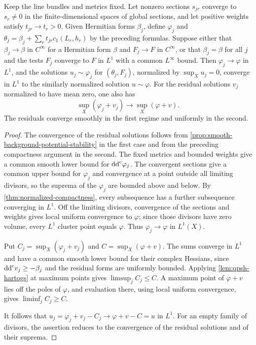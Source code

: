 \begin{theorem}\label{thm:moving-divisorial-potential-stability}
Keep the line bundles and metrics fixed. Let nonzero sections $s_{jr}$ converge to $s_r\ne0$ in the finite-dimensional spaces of global sections, and let positive weights satisfy $t_{jr}\to t_r>0$. Given Hermitian forms $\beta_j$, define $\varphi_j$ and $\theta_j=\beta_j+\sum_rt_{jr}c_1(L_r,h_r)$ by the preceding formulas. Suppose either that $\beta_j\to\beta$ in $C^\infty$ for a Hermitian form $\beta$ and $F_j\to F$ in $C^\infty$, or that $\beta_j=\beta$ for all $j$ and the tests $F_j$ converge to $F$ in $L^1$ with a common $L^\infty$ bound. Then $\varphi_j\to\varphi$ in $L^1$, and the solutions $u_j\sim\varphi_j$ for $(\theta_j,F_j)$, normalized by $\sup_Xu_j=0$, converge in $L^1$ to the similarly normalized solution $u\sim\varphi$. For the residual solutions $v_j$ normalized to have mean zero, one also has
\[
 \sup_X(\varphi_j+v_j)\longrightarrow\sup_X(\varphi+v).
\]
The residuals converge smoothly in the first regime and uniformly in the second.
\end{theorem}
\begin{proof}
The convergence of the residual solutions follows from \cref{prop:smooth-background-potential-stability} in the first case and from the preceding compactness argument in the second. The fixed metrics and bounded weights give a common smooth lower bound for $\mathrm{dd}^{\mathrm{c}}\varphi_j$. The convergent sections give a common upper bound for $\varphi_j$ and convergence at a point outside all limiting divisors, so the suprema of the $\varphi_j$ are bounded above and below. By \cref{thm:normalized-compactness}, every subsequence has a further subsequence converging in $L^1$. Off the limiting divisors, convergence of the sections and weights gives local uniform convergence to $\varphi$; since those divisors have zero volume, every $L^1$ cluster point equals $\varphi$. Thus $\varphi_j\to\varphi$ in $L^1(X)$.

Put $C_j=\sup_X(\varphi_j+v_j)$ and $C=\sup_X(\varphi+v)$. The sums converge in $L^1$ and have a common smooth lower bound for their complex Hessians, since $\mathrm{dd}^{\mathrm{c}} v_j\geq-\beta_j$ and the residual forms are uniformly bounded. Applying \cref{lem:qpsh-hartogs} at maximum points gives $\limsup_jC_j\leq C$. A maximum point of $\varphi+v$ lies off the poles of $\varphi$, and evaluation there, using local uniform convergence, gives $\liminf_jC_j\geq C$.

It follows that $u_j=\varphi_j+v_j-C_j\to\varphi+v-C=u$ in $L^1$. For an empty family of divisors, the assertion reduces to the convergence of the residual solutions and of their suprema.
\end{proof}


